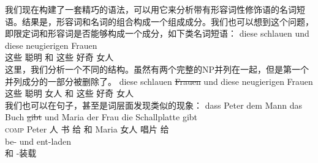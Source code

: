 我们现在构建了一套精巧的语法，可以用它来分析带有形容词性修饰语的名词短语。结果是，形容词和名词的组合构成一个组成成分。我们也可以想到这个问题，即限定词和形容词是否能够构成一个成分，如下类名词短语：
\ea
\gll diese schlauen und diese neugierigen Frauen\\
	 这些 聪明 和 这些 好奇 女人\\
\z
这里，我们分析一个不同的结构。虽然有两个完整的NP并列在一起，但是第一个并列成分的一部分被删除了。
\ea
\gll diese schlauen \st{Frauen} und diese neugierigen Frauen\\
	  这些 聪明 女人 和 这些 好奇 女人\\
\z
我们也可以在句子，甚至是词层面发现类似的现象：
\eal
\ex 
\gll dass Peter dem Mann das Buch \st{gibt} und Maria der Frau die Schallplatte gibt\\
     \textsc{comp} Peter  人  书 给 和 Maria  女人  唱片 给\\
\ex 
\gll be- und ent-laden\\
	 \prt{} 和 \prt{}-装载\\
\zl


